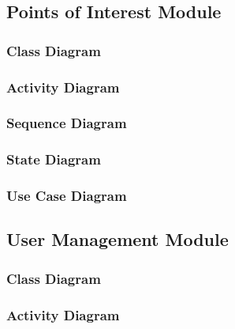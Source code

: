 \documentclass{article}
\begin{document}
		\clearpage

		\subsection{Points of Interest Module}\label{subsec:uml-diagrams-poi}
		

			\subsubsection{Class Diagram}\label{subsec:uml-diagrams-poi-class}
			
			
			\subsubsection{Activity Diagram}\label{subsec:uml-diagrams-poi-act}
			
			
			\subsubsection{Sequence Diagram}\label{subsec:uml-diagrams-poi-seq}
						
			
			\subsubsection{State Diagram}\label{subsec:uml-diagrams-poi-state}
			
			
			\subsubsection{Use Case Diagram}\label{subsec:uml-diagrams-poi-uc}
		
		\clearpage
	
		\subsection{User Management Module}\label{subsec:uml-diagrams-users}
			
		
			\subsubsection{Class Diagram}\label{subsec:uml-diagrams-users-class}
			
			
			\subsubsection{Activity Diagram}\label{subsec:uml-diagrams-users-act}
			
\end{document}
